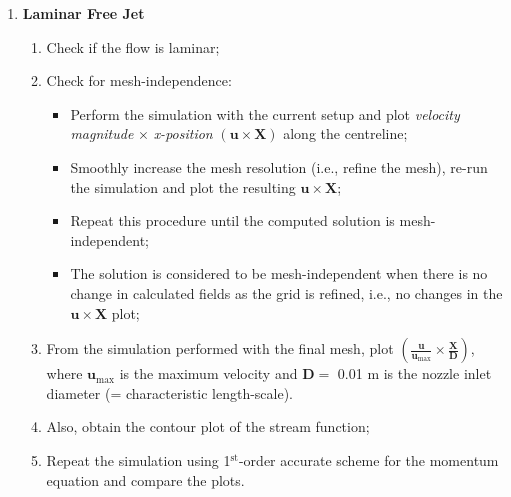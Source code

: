 \documentclass[12pts,a4paper,amsmath,amssymb,floatfix]{article}%
\newcommand{\frc}{\displaystyle\frac}
\begin{document}
\begin{enumerate}[label=\bfseries Problem \arabic*:]
\begin{enumerate}[label=\bfseries Task 1.\arabic*]

\item\label{Practical1:Task1} {\bf Laminar Free Jet}
  \begin{enumerate}
     \item Check if the flow is laminar;
     \item\label{Task1:MeshIndependenceCriteria} Check for mesh-independence:
        \begin{itemize}
            \item Perform the simulation with the current setup and plot {\it velocity magnitude} $\times$ {\it x-position} $\left(\mathbf{u}\times\mathbf{X}\right)$ along the centreline;
            \item Smoothly increase the mesh resolution (i.e., refine the mesh), re-run the simulation and plot the resulting $\mathbf{u}\times\mathbf{X}$;
            \item Repeat this procedure until the computed solution is mesh-independent;
            \item The solution is considered to be mesh-independent when there is no change in calculated fields as the grid is refined, i.e., no changes in the $\mathbf{u}\times\mathbf{X}$ plot;
        \end{itemize}
     \item From the simulation performed with the final mesh, plot $\left(\frc{\mathbf{u}}{\mathbf{u}_{\text{max}}}\times \frc{\mathbf{X}}{\mathbf{D}}\right)$, where $\mathbf{u}_{\text{max}}$ is the maximum velocity and $\mathbf{D}=$ 0.01 m is the nozzle inlet diameter (= characteristic length-scale).
     \item\label{Task1:StreamFunction} Also, obtain the contour plot of the stream function;
     \item Repeat the simulation using 1$^{\text{st}}$-order accurate scheme for the momentum equation and compare the plots.
  \end{enumerate}


\end{enumerate}
\end{enumerate}
\end{document}
